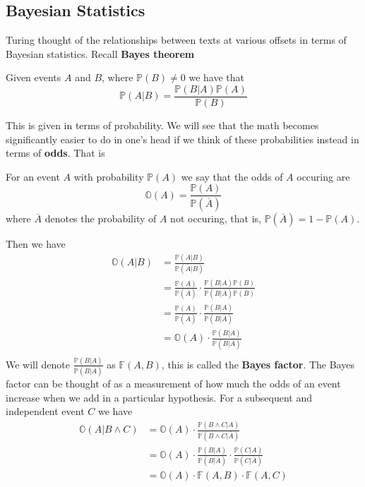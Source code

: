   \subsection{Bayesian Statistics}
  Turing thought of the relationships between texts at various
  offsets in terms of Bayesian statistics. Recall {\bf{Bayes theorem}}
  \begin{theorem}
    Given events $A$ and $B$, where $\mathbb{P}(B) \ne 0$ we have that
    \[
      \mathbb{P}(A|B) = \frac{\mathbb{P}(B|A)\mathbb{P}(A)}{\mathbb{P}(B)}
    \]
  \end{theorem}
  \noindent This is given in terms of probability. We will see that
  the math becomes significantly easier to do in one's head if we
  think of these probabilities instead in terms of {\bf{odds}}. That is
  \begin{definition}
    For an event $A$ with probability $\mathbb{P}(A)$ we say that the
    odds of $A$ occuring are
    \[
      \mathbb{O}(A) = \frac{\mathbb{P}(A)}{\mathbb{P}(\overline{A})}
    \]
    where $\overline{A}$ denotes the probability of $A$ not occuring,
    that is, $\mathbb{P}(\overline{A}) = 1-\mathbb{P}(A)$.
  \end{definition}
  \noindent Then we have
  \begin{align*}
    \mathbb{O}(A|B) & =
    \frac{\mathbb{P}(A|B)}{\mathbb{P}(\overline{A}|B)}
    \\
    & =
    \frac{\mathbb{P}(A)}{\mathbb{P}(\overline{A})}\cdot\frac{\mathbb{P}(B|A)\mathbb{P}(B)}{\mathbb{P}(B|\overline{A})\mathbb{P}(B)}
    \\
    & =
    \frac{\mathbb{P}(A)}{\mathbb{P}(\overline{A})}\cdot\frac{\mathbb{P}(B|A)}{\mathbb{P}(B|\overline{A})}
    \\
    & =
    \mathbb{O}(A)\cdot\frac{\mathbb{P}(B|A)}{\mathbb{P}(B|\overline{A})}
    \\
  \end{align*}
  \noindent We will denote
  $\frac{\mathbb{P}(B|A)}{\mathbb{P}(B|\overline{A})}$ as
  $\mathbb{F}(A,B)$, this is called the {\bf{Bayes factor}}. The
  Bayes factor can be thought of as a measurement of how much the
  odds of an event increase when we add in a particular hypothesis.
  For a subsequent and independent event $C$ we have
  \begin{align*}
    \mathbb{O}(A|B\wedge C) & =
    \mathbb{O}(A)\cdot\frac{\mathbb{P}(B\wedge C|
    A)}{\mathbb{P}(B\wedge C| \overline{A})}
    \\
    & = \mathbb{O}(A)\cdot\frac{\mathbb{P}(B| A)}{\mathbb{P}(B|
    \overline{A})}\cdot\frac{\mathbb{P}(C|A)}{\mathbb{P}(C|\overline{A})}
    \\
    & = \mathbb{O}(A)\cdot \mathbb{F}(A,B) \cdot \mathbb{F}(A,C)
  \end{align*}
